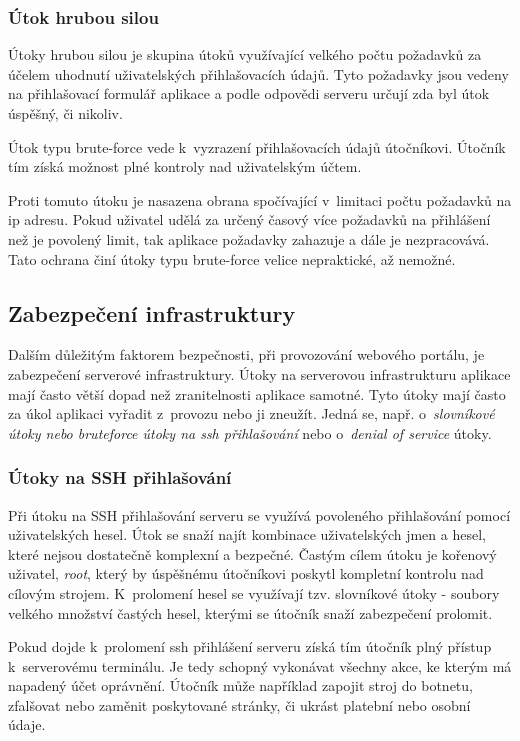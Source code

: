 \subsubsection{Útok hrubou silou}

Útoky hrubou silou\cite{bruteforce} je skupina útoků využívající velkého počtu požadavků za účelem uhodnutí uživatelských přihlašovacích údajů. Tyto požadavky jsou vedeny na přihlašovací formulář aplikace a podle odpovědi serveru určují zda byl útok úspěšný, či nikoliv.

Útok typu brute-force vede k~vyzrazení přihlašovacích údajů útočníkovi. Útočník tím získá možnost plné kontroly nad uživatelským účtem.

Proti tomuto útoku je nasazena obrana spočívající v~limitaci počtu požadavků na \acrshort{ip} adresu. Pokud uživatel udělá za určený časový více požadavků na přihlášení než je povolený limit, tak aplikace požadavky zahazuje a dále je nezpracovává. Tato ochrana činí útoky typu brute-force velice nepraktické, až nemožné.

\subsection{Zabezpečení infrastruktury}

Dalším důležitým faktorem bezpečnosti, při provozování webového portálu, je zabezpečení serverové infrastruktury. Útoky na serverovou infrastrukturu aplikace mají často větší dopad než zranitelnosti aplikace samotné. Tyto útoky mají často za úkol aplikaci vyřadit z~provozu nebo ji zneužít. Jedná se, např. o~\emph{slovníkové útoky nebo bruteforce útoky na \acrshort{ssh} přihlašování} nebo o~\emph{denial of service} útoky.

\subsubsection{Útoky na SSH přihlašování}

Při útoku na SSH přihlašování serveru se využívá povoleného přihlašování pomocí uživatelských hesel. Útok se snaží najít kombinace uživatelských jmen a hesel, které nejsou dostatečně komplexní a bezpečné. Častým cílem útoku je kořenový uživatel, \emph{root}, který by úspěšnému útočníkovi poskytl kompletní kontrolu nad cílovým strojem. K~prolomení hesel se využívají tzv. slovníkové útoky - soubory velkého množství častých hesel, kterými se útočník snaží zabezpečení prolomit.

Pokud dojde k~prolomení \acrshort{ssh} přihlášení serveru získá tím útočník plný přístup k~serverovému terminálu. Je tedy schopný vykonávat všechny akce, ke kterým má napadený účet oprávnění. Útočník může například zapojit stroj do botnetu\cite{botnet}, zfalšovat nebo zaměnit poskytované stránky, či ukrást platební nebo osobní údaje.

